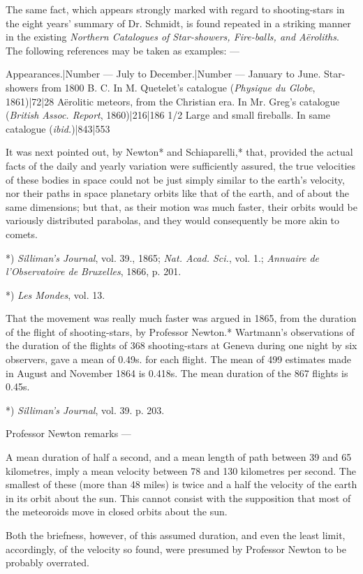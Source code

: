 \documentclass[a4paper, 12pt, oneside, polutonikogreek, english]{article}
\begin{document}
The same fact, which appears strongly marked with regard to shooting-stars in the eight years' summary of Dr. Schmidt, is found repeated in a striking manner in the existing \emph{Northern Catalogues of Star-showers, Fire-balls, and Aëroliths}. The following references may be taken as examples: ---

Appearances.|Number --- July to December.|Number --- January to June. 
Star-showers from 1800 B. C. In M. Quetelet's catalogue (\emph{Physique du Globe}, 1861)|72|28 
Aërolitic meteors, from the Christian era. In Mr. Greg's catalogue (\emph{British Assoc. Report}, 1860)|216|186 1/2 
Large and small fireballs. In same catalogue (\emph{ibid.})|843|553

It was next pointed out, by Newton* and Schiaparelli,* that, provided the actual facts of the daily and yearly variation were sufficiently assured, the true velocities of these bodies in space could not be just simply similar to the earth's velocity, nor their paths in space planetary orbits like that of the earth, and of about the same dimensions; but that, as their motion was much faster, their orbits would be variously distributed parabolas, and they would consequently be more akin to comets.

*) \emph{Silliman's Journal}, vol. 39., 1865; \emph{Nat. Acad. Sci.}, vol. 1.; \emph{Annuaire de l'Observatoire de Bruxelles}, 1866, p. 201.

*) \emph{Les Mondes}, vol. 13.

That the movement was really much faster was argued in 1865, from the duration of the flight of shooting-stars, by Professor Newton.* Wartmann's observations of the duration of the flights of 368 shooting-stars at Geneva during one night by six observers, gave a mean of 0.49s. for each flight. The mean of 499 estimates made in August and November 1864 is 0.418s. The mean duration of the 867 flights is 0.45s.

*) \emph{Silliman's Journal}, vol. 39. p. 203.

Professor Newton remarks ---

A mean duration of half a second, and a mean length of path between 39 and 65 kilometres, imply a mean velocity between 78 and 130 kilometres per second. The smallest of these (more than 48 miles) is twice and a half the velocity of the earth in its orbit about the sun. This cannot consist with the supposition that most of the meteoroids move in closed orbits about the sun.

Both the briefness, however, of this assumed duration, and even the least limit, accordingly, of the velocity so found, were presumed by Professor Newton to be probably overrated.
\end{document}
